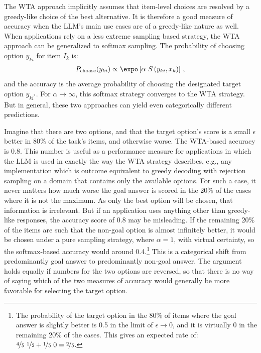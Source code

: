\documentclass[fleqn]{article}
\begin{document}
The WTA approach implicitly assumes that item-level choices are resolved by a greedy-like choice of the best alternative.
It is therefore a good measure of accuracy when the LLM's main use cases are of a greedy-like nature as well.
When applications rely on a less extreme sampling based strategy, the WTA approach can be generalized to softmax sampling.
The probability of choosing option $y_{ki}$ for item $I_{k}$ is:
%
\begin{align*}
P_{\text{choose}}(y_{ki}) \propto \expo \left [ \alpha \ S \left( y_{ki}, x_{k} \right) \right ]\,,
\end{align*}
%
and the accuracy is the average probability of choosing the designated target option $y_{ki^{*}}$.
For $\alpha \rightarrow \infty$, this softmax strategy converges to the WTA strategy.
But in general, these two approaches can yield even categorically different predictions.

Imagine that there are two options, and that the target option's score is a small $\epsilon$ better in 80\% of the task's items, and otherwise worse.
The WTA-based accuracy is 0.8.
This number is useful as a performance measure for applications in which the LLM is used in exactly the way the WTA strategy describes, e.g., any implementation which is outcome equivalent to greedy decoding with rejection sampling on a domain that contains only the available options.
For such a case, it never matters how much worse the goal answer is scored in the 20\% of the cases where it is not the maximum.
As only the best option will be chosen, that information is irrelevant.
But if an application uses anything other than greedy-like responses, the accuracy score of 0.8 may be misleading.
If the remaining 20\% of the items are such that the non-goal option is almost infinitely better, it would be chosen under a pure sampling strategy, where $\alpha = 1$, with virtual certainty, so the softmax-based accuracy would around 0.4.\footnote{The probability of the target option in the 80\% of items where the goal answer is slightly better is 0.5 in the limit of $\epsilon \rightarrow 0$, and it is virtually 0 in the remaining 20\% of the cases. This gives an expected rate of: $\nicefrac{4}{5} \ \nicefrac{1}{2} + \nicefrac{1}{5} \ 0 = \nicefrac{2}{5}$.}
This is a categorical shift from predominantly goal answer to predominantly non-goal answer.
The argument holds equally if numbers for the two options are reversed, so that there is no way of saying which of the two measures of accuracy would generally be more favorable for selecting the target option.
\end{document}
